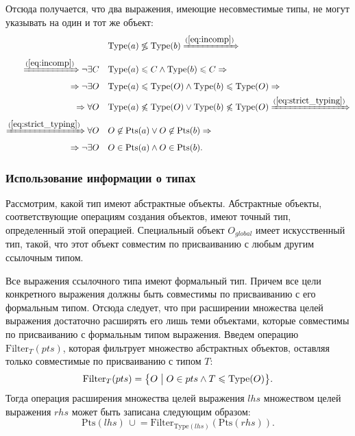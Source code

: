 \documentclass[14pt,titlepage]{extarticle}
\newcommand{\Type}[1]{\textrm{Type}(#1)}
\newcommand{\Pts}[1]{\textrm{Pts}(#1)}
\newcommand{\Filter}[2]{\textrm{Filter}_{#1}(#2)}
\newcommand{\cupe}{\,\cup\!\!=}
\renewcommand{\leq}{\leqslant}
\newcommand{\incomp}{\not\lessgtr}
\begin{document}
      Отсюда получается, что два выражения, имеющие несовместимые типы, не
      могут указывать на один и тот же объект:
      \begin{align*}
        \quad& \Type{a} \incomp \Type{b}
        \xRightarrow{(\ref{eq:incomp})} \\ \xRightarrow{(\ref{eq:incomp})}
        \lnot \exists C \quad& \Type{a} \leq C \land \Type{b} \leq C
        \Rightarrow \\ \Rightarrow
        \lnot \exists O \quad& \Type{a} \leq \Type{O}
                         \land \Type{b} \leq \Type{O}
        \Rightarrow \\ \Rightarrow
        \forall O \quad& \Type{a} \not\leq \Type{O}
                    \lor \Type{b} \not\leq \Type{O}
        \xRightarrow{(\ref{eq:strict_typing})} \\ \xRightarrow{(\ref{eq:strict_typing})}
        \forall O \quad& O \not\in \Pts{a}
                    \lor O \not\in \Pts{b}
        \Rightarrow \\ \Rightarrow
        \lnot \exists O \quad& O \in \Pts{a}
                         \land O \in \Pts{b}.
      \end{align*}

      \subsubsection{Использование информации о типах}
        \label{sec:cast_introd}

        Рассмотрим, какой тип имеют абстрактные объекты. Абстрактные объекты,
        соответствующие операциям создания объектов, имеют точный тип,
        определенный этой операцией.
        Специальный объект $O_{global}$ имеет искусственный тип, такой, что
        этот объект совместим по присваиванию с любым другим ссылочным типом.

        Все выражения ссылочного типа имеют формальный тип. Причем все цели
        конкретного выражения должны быть совместимы по присваиванию с его
        формальным типом.
        Отсюда следует, что при расширении множества целей выражения
        достаточно расширять его лишь теми объектами, которые совместимы по
        присваиванию с формальным типом выражения.
        Введем операцию $\Filter{T}{pts}$, которая фильтрует множество
        абстрактных объектов, оставляя только совместимые по присваиванию с
        типом $T$:
        \[ \Filter{T}{pts} =
           \bigl\{ O \bigm| O \in pts \land T \leq \Type{O} \bigr\}. \]
        Тогда операция расширения множества целей выражения $lhs$ множеством
        целей выражения $rhs$ может быть записана следующим образом:
        \[ \Pts{lhs} \cupe \Filter{\Type{lhs}}{\Pts{rhs}}. \]
\end{document}
